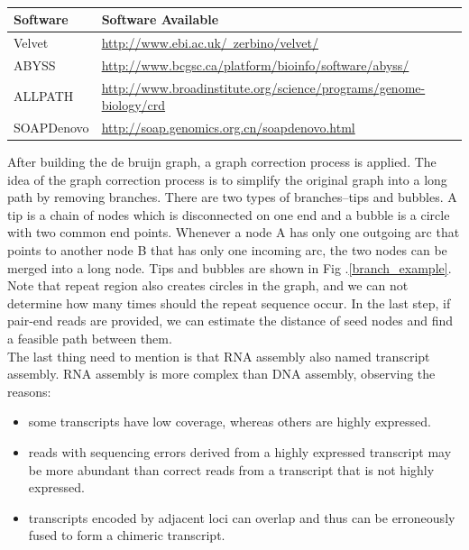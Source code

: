 \documentclass{article}
\begin{document}
\begin{table}[ht]
\begin{center}
\caption{}\label{links_of_assemblers}
\begin{tabular}{l|l}
\hline
Software &Software Available\\
\hline
Velvet &\href{http://www.ebi.ac.uk/~zerbino/velvet/}{http://www.ebi.ac.uk/~zerbino/velvet/}\\
\hline
ABYSS &\href{http://www.bcgsc.ca/platform/bioinfo/software/abyss/}{http://www.bcgsc.ca/platform/bioinfo/software/abyss/}\\
\hline
ALLPATH &\href{http://www.broadinstitute.org/science/programs/genome-biology/crd}{http://www.broadinstitute.org/science/programs/genome-biology/crd}\\
\hline
SOAPDenovo &\href{http://soap.genomics.org.cn/soapdenovo.html}{http://soap.genomics.org.cn/soapdenovo.html}\\
\hline
\end{tabular}
\end{center}
\end{table}
\noindent After building the de bruijn graph, a graph correction process is applied. The idea of the graph correction process is to simplify the original graph into a long path by removing branches. There are two types of branches--tips and bubbles. A tip is a chain of nodes which is disconnected on one end and a bubble is a circle with two common end points. Whenever a node A has only one outgoing arc that points to another node B that has only one incoming arc, the two nodes can be merged into a long node. Tips and bubbles are shown in Fig .\ref{branch_example}. Note that repeat region also creates circles in the graph, and we can not determine how many times should the repeat sequence occur. In the last step, if pair-end reads are provided, we can estimate the distance of seed nodes and find a feasible path between them.\\
The last thing need to mention is that RNA assembly also named transcript assembly. RNA assembly is more complex than DNA assembly, observing the reasons:
\begin{itemize}
 \item some transcripts have low coverage, whereas others are highly expressed.
 \item reads with sequencing errors derived from a highly expressed transcript may be more abundant than correct reads from a transcript that is not highly expressed.
 \item transcripts encoded by adjacent loci can overlap and thus can be erroneously fused to form a chimeric transcript.
\end{itemize}   
\end{document}
